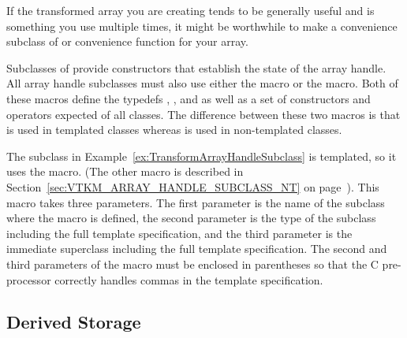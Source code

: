 
If the transformed array you are creating tends to be generally useful and
is something you use multiple times, it might be worthwhile to make a
convenience subclass of  or convenience
 function for your array.


\label{sec:VTKM_ARRAY_HANDLE_SUBCLASS}

Subclasses of  provide constructors that
establish the state of the array handle. All array handle subclasses must
also use either the  macro or the
 macro. Both of these macros
define the typedefs , , and
 as well as a set of constructors and operators
expected of all  classes. The difference
between these two macros is that 
is used in templated classes whereas
 is used in non-templated
classes.

The  subclass in
Example~\ref{ex:TransformArrayHandleSubclass} is templated, so it uses the
 macro. (The other macro is
described in Section~\ref{sec:VTKM_ARRAY_HANDLE_SUBCLASS_NT} on
page~\pageref{sec:VTKM_ARRAY_HANDLE_SUBCLASS_NT}). This macro takes three
parameters. The first parameter is the name of the subclass where the macro
is defined, the second parameter is the type of the subclass including the
full template specification, and the third parameter is the immediate
superclass including the full template specification. The second and third
parameters of the macro must be enclosed in parentheses so that the C
pre-processor correctly handles commas in the template specification.


\subsection{Derived Storage}
\label{sec:DerivedStorage}


